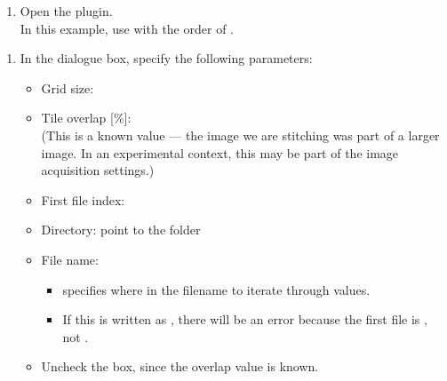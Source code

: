 \documentclass[letterpaper,10pt,english]{jupyterBook}
\begin{document}
\begin{enumerate}
%
\item {} 
\sphinxAtStartPar
Open the  plugin.\\
In this example, use  with the order of .

\end{enumerate}

\sphinxAtStartPar
{}
\begin{enumerate}
%
\setcounter{enumi}{1}
\item {} 
\sphinxAtStartPar
In the dialogue box, specify the following parameters:
\begin{itemize}
\item {} 
\sphinxAtStartPar
Grid size: 

\item {} 
\sphinxAtStartPar
Tile overlap {[}\%{]}: \\
(This is a known value — the image we are stitching was part of a larger image. In an experimental context, this may be part of the image acquisition settings.)

\item {} 
\sphinxAtStartPar
First file index: 

\item {} 
\sphinxAtStartPar
Directory: point to the  folder

\item {} 
\sphinxAtStartPar
File name: 
\begin{itemize}
\item {} 
\sphinxAtStartPar
{} specifies where in the filename to iterate through values.

\item {} 
\sphinxAtStartPar
If this is written as , there will be an error because the first file is , not .

\end{itemize}

\item {} 
\sphinxAtStartPar
Uncheck the  box, since the overlap value is known.

\end{itemize}

\end{enumerate}
\end{document}
